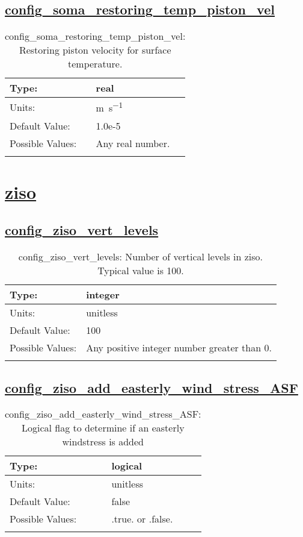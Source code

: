 \subsection[config\_soma\_restoring\_temp\_piston\_vel]{\hyperref[sec:nm_tab_soma]{config\_soma\_restoring\_temp\_piston\_vel}}
\label{subsec:nm_sec_config_soma_restoring_temp_piston_vel}
\begin{center}
\begin{longtable}{| p{2.0in} || p{4.0in} |}
    \hline
    Type: & real \\
    \hline
    Units: & \si{m.s^{-1}} \\
    \hline
    Default Value: & 1.0e-5 \\
    \hline
    Possible Values: & Any real number. \\
    \hline
    \caption{config\_soma\_restoring\_temp\_piston\_vel: Restoring piston velocity for surface temperature.}
\end{longtable}
\end{center}
\section[ziso]{\hyperref[sec:nm_tab_ziso]{ziso}}
\label{sec:nm_sec_ziso}
\subsection[config\_ziso\_vert\_levels]{\hyperref[sec:nm_tab_ziso]{config\_ziso\_vert\_levels}}
\label{subsec:nm_sec_config_ziso_vert_levels}
\begin{center}
\begin{longtable}{| p{2.0in} || p{4.0in} |}
    \hline
    Type: & integer \\
    \hline
    Units: & \si{unitless} \\
    \hline
    Default Value: & 100 \\
    \hline
    Possible Values: & Any positive integer number greater than 0. \\
    \hline
    \caption{config\_ziso\_vert\_levels: Number of vertical levels in ziso. Typical value is 100.}
\end{longtable}
\end{center}
\subsection[config\_ziso\_add\_easterly\_wind\_stress\_ASF]{\hyperref[sec:nm_tab_ziso]{config\_ziso\_add\_easterly\_wind\_stress\_ASF}}
\label{subsec:nm_sec_config_ziso_add_easterly_wind_stress_ASF}
\begin{center}
\begin{longtable}{| p{2.0in} || p{4.0in} |}
    \hline
    Type: & logical \\
    \hline
    Units: & \si{unitless} \\
    \hline
    Default Value: & false \\
    \hline
    Possible Values: & .true. or .false. \\
    \hline
    \caption{config\_ziso\_add\_easterly\_wind\_stress\_ASF: Logical flag to determine if an easterly windstress is added}
\end{longtable}
\end{center}
